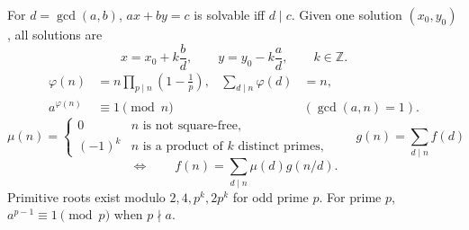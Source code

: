 \begingroup\small
For $d=\gcd(a,b)$, $ax+by=c$ is solvable iff $d\mid c$. Given one solution
$(x_0,y_0)$, all solutions are
\[
 x=x_0+k\frac bd,\qquad y=y_0-k\frac ad,\qquad k\in\mathbb Z.
\]
\begin{align*}
 \varphi(n)&=n\prod_{p\mid n}\left(1-\frac1p\right),&
 \sum_{d\mid n}\varphi(d)&=n,\\
 a^{\varphi(n)}&\equiv1\pmod n &&(\gcd(a,n)=1).
\end{align*}
\[
 \mu(n)=\begin{cases}
 0&\text{$n$ is not square-free},\\
 (-1)^k&\text{$n$ is a product of $k$ distinct primes},
 \end{cases}
 \qquad
 g(n)=\sum_{d\mid n}f(d)
\]
\[
 \Longleftrightarrow\qquad
 f(n)=\sum_{d\mid n}\mu(d)g(n/d).
\]
Primitive roots exist modulo $2,4,p^k,2p^k$ for odd prime $p$.
For prime $p$, $a^{p-1}\equiv1\pmod p$ when $p\nmid a$.
\endgroup
